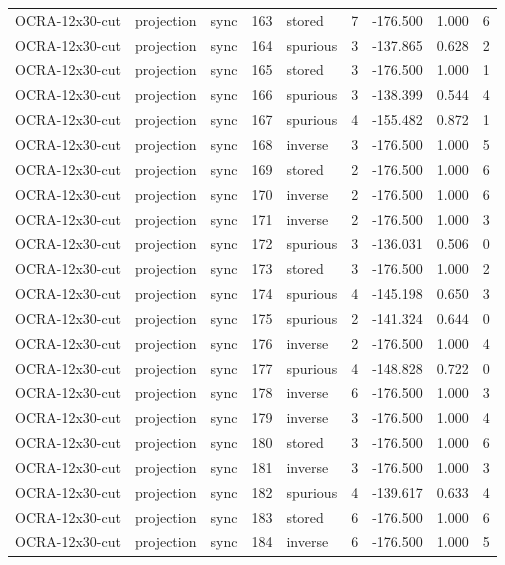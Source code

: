 \begin{tabular}{lllrlrrrr}
OCRA-12x30-cut & projection & sync & 163 & stored & 7 & -176.500 & 1.000 & 6 \\
OCRA-12x30-cut & projection & sync & 164 & spurious & 3 & -137.865 & 0.628 & 2 \\
OCRA-12x30-cut & projection & sync & 165 & stored & 3 & -176.500 & 1.000 & 1 \\
OCRA-12x30-cut & projection & sync & 166 & spurious & 3 & -138.399 & 0.544 & 4 \\
OCRA-12x30-cut & projection & sync & 167 & spurious & 4 & -155.482 & 0.872 & 1 \\
OCRA-12x30-cut & projection & sync & 168 & inverse & 3 & -176.500 & 1.000 & 5 \\
OCRA-12x30-cut & projection & sync & 169 & stored & 2 & -176.500 & 1.000 & 6 \\
OCRA-12x30-cut & projection & sync & 170 & inverse & 2 & -176.500 & 1.000 & 6 \\
OCRA-12x30-cut & projection & sync & 171 & inverse & 2 & -176.500 & 1.000 & 3 \\
OCRA-12x30-cut & projection & sync & 172 & spurious & 3 & -136.031 & 0.506 & 0 \\
OCRA-12x30-cut & projection & sync & 173 & stored & 3 & -176.500 & 1.000 & 2 \\
OCRA-12x30-cut & projection & sync & 174 & spurious & 4 & -145.198 & 0.650 & 3 \\
OCRA-12x30-cut & projection & sync & 175 & spurious & 2 & -141.324 & 0.644 & 0 \\
OCRA-12x30-cut & projection & sync & 176 & inverse & 2 & -176.500 & 1.000 & 4 \\
OCRA-12x30-cut & projection & sync & 177 & spurious & 4 & -148.828 & 0.722 & 0 \\
OCRA-12x30-cut & projection & sync & 178 & inverse & 6 & -176.500 & 1.000 & 3 \\
OCRA-12x30-cut & projection & sync & 179 & inverse & 3 & -176.500 & 1.000 & 4 \\
OCRA-12x30-cut & projection & sync & 180 & stored & 3 & -176.500 & 1.000 & 6 \\
OCRA-12x30-cut & projection & sync & 181 & inverse & 3 & -176.500 & 1.000 & 3 \\
OCRA-12x30-cut & projection & sync & 182 & spurious & 4 & -139.617 & 0.633 & 4 \\
OCRA-12x30-cut & projection & sync & 183 & stored & 6 & -176.500 & 1.000 & 6 \\
OCRA-12x30-cut & projection & sync & 184 & inverse & 6 & -176.500 & 1.000 & 5 \\

\end{tabular}
